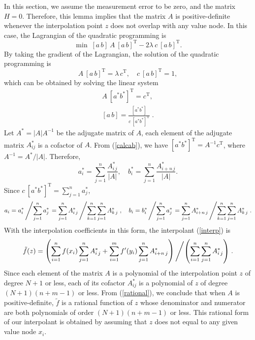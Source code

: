 In this section, we assume the measurement error to be zero, and the matrix
$H=0$.  Therefore, this lemma implies that the matrix $A$ is
positive-definite whenever the interpolation point $z$ does not overlap with
any value node.  In this case, the Lagrangian of the quadratic
programming is
\[ \min\; [a\,b]\: A\: [a\,b]^{\mathrm T} - 2 \lambda\: c\: [a\,b]^{\mathrm T}.
\]
By taking the gradient of the Lagrangian, the solution of the quadratic
programming is
\[ A\: [a\,b]^{\mathrm T} = \lambda\, c^{\mathrm T},
  \quad c\: [a\,b]^{\mathrm T} = 1, \]
which can be obtained by solving the linear system
\begin{equation} \begin{split} \label{calcab}
A\: [a^* b^*]^{\mathrm T} = c^{\mathrm T}, \\
[a\,b] = \frac{[a^* b^*]}{c\: [a^* b^*]^{\mathrm T}} \;.
\end{split} \end{equation}
Let $A^* = |A| A^{-1}$ be the adjugate matrix of $A$, each element of the
adjugate matrix $A^*_{ij}$ is a cofactor of $A$.
From (\ref{calcab}), we have
$[a^* b^*]^{\mathrm T} = A^{-1} c^{\mathrm T}$, where $A^{-1} = A^* / |A|$.
Therefore,
\[ a^*_i = \sum_{j=1}^n \frac{A^*_{i\,j}}{|A|}, \quad
   b^*_i = \sum_{j=1}^n \frac{A^*_{i+n\,j}}{|A|} . \]
Since $c\: [a^* b^*]^{\mathrm T} = \sum_{j=1}^n a^*_j$,
\[ a_i = a^*_i \left/ \sum_{j=1}^n a^*_j\right. = 
   \sum_{j=1}^n A^*_{i\,j}\left/\sum_{k=1}^n\sum_{j=1}^n A^*_{k\,j}
   \right., \quad
   b_i = b^*_i\left/\sum_{j=1}^n a^*_j\right. =
   \sum_{j=1}^n A^*_{i+n\,j}\left/\sum_{k=1}^n\sum_{j=1}^n A^*_{k\,j}
   \right. . \]
With the interpolation coefficients in this form, the interpolant
(\ref{interp}) is
\begin{equation} \label{rational}
  {\tilde f}(z) = \left(\sum_{i=1}^n f(x_i) \sum_{j=1}^n A^*_{i\,j} +
                        \sum_{i=1}^m f'(y_i) \sum_{j=1}^n A^*_{i+n\,j}\right)
  \left/ \left(\sum_{i=1}^n\sum_{j=1}^n A^*_{i\,j}\right)\right. .
\end{equation}
Since each element of the matrix $A$ is a polynomial of the interpolation point
$z$ of degree $N+1$ or less, each of its cofactor $A^*_{ij}$ is a polynomial of
$z$ of degree $(N+1)(n+m-1)$ or less.  From (\ref{rational}), we conclude that
when $A$ is positive-definite, $\tilde f$ is a rational function of $z$ whose
denominator and numerator are both polynomials of order $(N+1)(n+m-1)$ or less.
This rational form of our interpolant is obtained by assuming that $z$ does not
equal to any given value node $x_i$.

